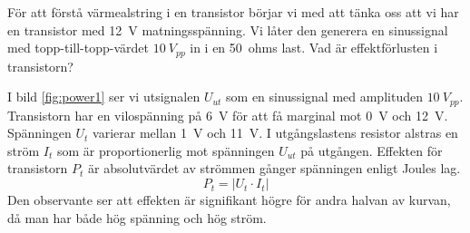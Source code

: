 För att förstå värmealstring i en transistor börjar vi med att tänka oss att vi
har en transistor med \SI{12}{\volt} matningsspänning.
Vi låter den generera en sinussignal med topp-till-topp-värdet \(10\ V_{pp}\) in i en 50~ohms last.
Vad är effektförlusten i transistorn?


I bild \ref{fig:power1} ser vi utsignalen \(U_{ut}\) som en sinussignal med
amplituden \(10\ V_{pp}\).
Transistorn har en vilospänning på \SI{6}{\volt} för att få marginal mot
\SI{0}{\volt} och \SI{+12}{\volt}. Spänningen \(U_t\) varierar
mellan \SI{1}{\volt} och \SI{11}{\volt}. I utgångslastens resistor alstras en ström \(I_t\) som är proportionerlig mot spänningen
\(U_{ut}\) på utgången. Effekten för transistorn \(P_t\) är absolutvärdet av strömmen gånger spänningen enligt Joules lag. 
\[P_t = \lvert U_t \cdot I_t \rvert\]
Den observante ser att effekten är signifikant högre för andra halvan av kurvan, då man har både
hög spänning och hög ström.
